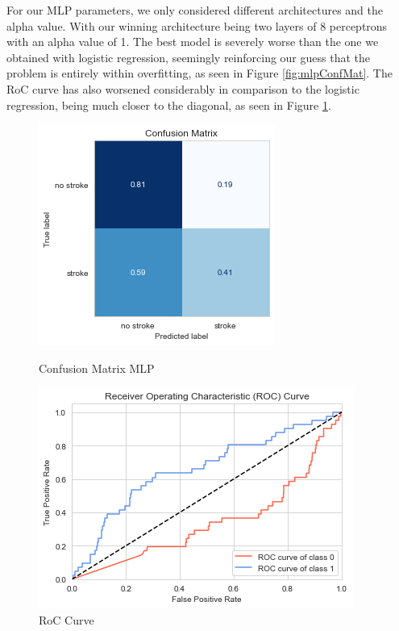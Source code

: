 \documentclass[11pt, a4paper]{article}
\begin{document}
For our MLP parameters, we only considered different architectures and the alpha value. With our winning architecture being two layers of 8 perceptrons with an alpha value of 1. The best model is severely worse than the one we obtained with logistic regression, seemingly reinforcing our guess that the problem is entirely within overfitting, as seen in Figure \ref{fig:mlpConfMat}. The RoC curve has also worsened considerably in comparison to the logistic regression, being much closer to the diagonal, as seen in Figure \ref{fig:RoCMLP}.


\begin{figure}[H]
    \includegraphics[width=\textwidth]{images/mlpConfMat.png}
    \caption{Confusion Matrix MLP}
    \label{fig:mlpConfMat}
\endminipage\hfill
{}
    \includegraphics[width=\textwidth]{images/rocMLP.png}
    \caption{RoC Curve}
    \label{fig:RoCMLP}
\endminipage\hfill
\end{figure}
\end{document}
